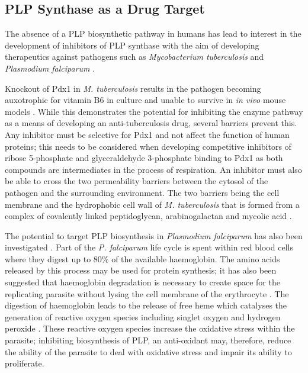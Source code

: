 \subsection{PLP Synthase as a Drug Target}
The absence of a PLP biosynthetic pathway in humans has lead to interest in the development of inhibitors of PLP synthase with the aim of developing therapeutics against pathogens such as \textit{Mycobacterium tuberculosis} and \textit{Plasmodium falciparum} \cite{Kronenburger2013}. 

Knockout of Pdx1 in \textit{M. tuberculosis} results in the pathogen becoming auxotrophic for vitamin B6 in culture and unable to survive in \textit{in vivo} mouse models \cite{Dick2010}. While this demonstrates the potential for inhibiting the enzyme pathway as a means of  developing an anti-tuberculosis drug, several barriers prevent this. Any inhibitor must be selective for Pdx1 and not affect the function of human proteins; this needs to be considered when developing competitive inhibitors of ribose 5-phosphate and glyceraldehyde 3-phosphate binding to Pdx1 as both compounds are intermediates in the process of respiration. An inhibitor must also be able to cross the two permeability barriers between the cytosol of the pathogen and the surrounding environment. The two barriers being the cell membrane  and the hydrophobic cell wall of \textit{M. tuberculosis} that is formed from a complex of covalently linked peptidoglycan, arabinogalactan and mycolic acid \cite{Niederweis2008}.

The potential to target PLP biosynthesis in \textit{Plasmodium falciparum} has also been investigated \cite{Kronenburger2013}. Part of the \textit{P. falciparum} life cycle is spent within red blood cells where they digest up to 80\% of the available haemoglobin. The amino acids released by this process may be used for protein synthesis; it has also been suggested that haemoglobin degradation is necessary to create space for the replicating parasite without lysing the cell membrane of the erythrocyte \cite{Lew2004}. The digestion of haemoglobin leads to the release of free heme which catalyses the generation of reactive oxygen species including singlet oxygen and hydrogen peroxide \cite{Atamna1993}. These reactive oxygen species increase the oxidative stress within the parasite; inhibiting biosynthesis of PLP, an anti-oxidant may, therefore, reduce the ability of the parasite to deal with oxidative stress and impair its ability to proliferate.\par 


